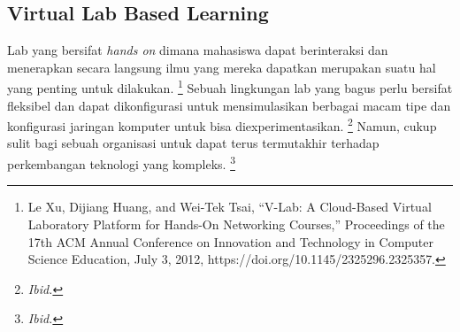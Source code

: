 \subsection{Virtual Lab Based Learning}
\label{sec:latexBrief}
Lab yang bersifat \textit{hands on} dimana mahasiswa dapat berinteraksi dan menerapkan secara langsung ilmu yang mereka dapatkan merupakan suatu hal
yang penting untuk dilakukan.
\footnote{Le Xu, Dijiang Huang, and Wei-Tek Tsai, “V-Lab: A Cloud-Based Virtual Laboratory Platform for Hands-On Networking Courses,” Proceedings of the 17th ACM Annual Conference on Innovation and Technology in Computer Science Education, July 3, 2012, https://doi.org/10.1145/2325296.2325357.}
Sebuah lingkungan lab yang bagus perlu bersifat fleksibel dan dapat dikonfigurasi untuk mensimulasikan berbagai macam tipe dan konfigurasi jaringan komputer
untuk bisa diexperimentasikan. 
\footnote{\textit{Ibid.}}
Namun, cukup sulit bagi sebuah organisasi untuk dapat terus termutakhir terhadap perkembangan teknologi yang kompleks.
\footnote{\textit{Ibid.}}
\par

